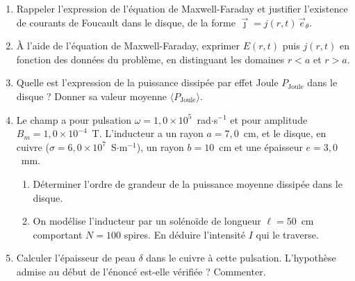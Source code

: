 \begin{enumerate}

	\item Rappeler l'expression de l'équation de Maxwell-Faraday et justifier l'existence de courants de Foucault dans le disque, de la forme $\vec{\jmath}=j(r,t)\,\vec{e}_\theta$.

	\item À l'aide de l'équation de Maxwell-Faraday, exprimer $E(r,t)$ puis $j(r,t)$ en fonction des données du problème, en distinguant les domaines $r<a$ et $r>a$.

	\item Quelle est l'expression de la puissance dissipée par effet Joule $P_{\mathrm{Joule}}$ dans le disque ? Donner sa valeur moyenne $\langle P_{\mathrm{Joule}}\rangle$.

	\item Le champ a pour pulsation $\omega=1,0\times10^{5}$~rad$\cdot$s$^{-1}$ et pour amplitude $B_m=1,0\times10^{-4}$~T. L'inducteur a un rayon $a=7,0$~cm, et le disque, en cuivre ($\sigma=6,0\times10^{7}$~S$\cdot$m$^{-1}$), un rayon $b=10$~cm et une épaisseur $e=3,0$~mm.
	\begin{enumerate}
		\item Déterminer l'ordre de grandeur de la puissance moyenne dissipée dans le disque.
		\item On modélise l'inducteur par un solénoïde de longueur $\ell=50$~cm comportant $N=100$ spires. En déduire l'intensité $I$ qui le traverse.
	\end{enumerate}

	\item Calculer l'épaisseur de peau $\delta$ dans le cuivre à cette pulsation. L'hypothèse admise au début de l'énoncé est-elle vérifiée ? Commenter.

\end{enumerate}

\newpage

